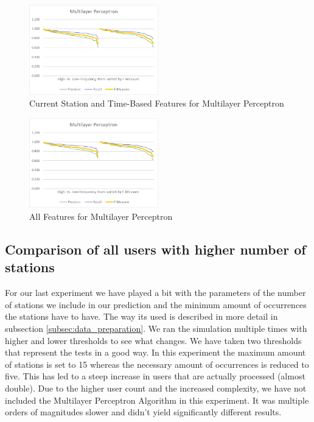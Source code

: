 \begin{figure}[H]
	\centering
	\includegraphics[width=0.5\textwidth]{files/high_vs_low_frequency/mp_csta_ts}
	\caption{Current Station and Time-Based Features for Multilayer Perceptron}
\end{figure}

\begin{figure}[H]
	\centering
	\includegraphics[width=0.5\textwidth]{files/high_vs_low_frequency/mp_all}
	\caption{All Features for Multilayer Perceptron}
\end{figure}


\newpage
\subsection{Comparison of all users with higher number of stations}
For our last experiment we have played a bit with the parameters of the number of stations we include in our prediction and the minimum amount of occurrences the stations have to have. The way its used is described in more detail in subsection \ref{subsec:data_preparation}. We ran the simulation multiple times with higher and lower thresholds to see what changes. We have taken two thresholds that represent the tests in a good way. In this experiment the maximum amount of stations is set to 15 whereas the necessary amount of occurrences is reduced to five. This has led to a steep increase in users that are actually processed (almost double). Due to the higher user count and the increased complexity, we have not included the Multilayer Perceptron Algorithm in this experiment. It was multiple orders of magnitudes slower and didn't yield significantly different results. 

